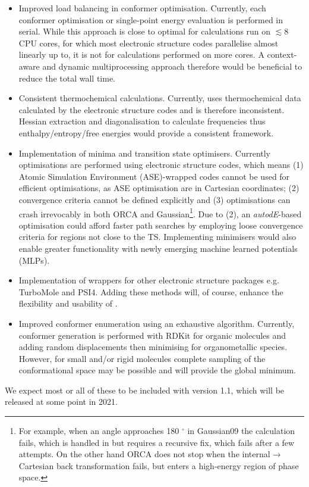 \documentclass[../../main.tex]{subfiles}
\begin{document}
\begin{itemize}
	\item Improved load balancing in conformer optimisation. Currently, each conformer optimisation or single-point energy evaluation is performed in serial. While this approach is close to optimal for calculations run on $\lesssim 8$ CPU cores, for which most electronic structure codes parallelise almost linearly up to, it is not for \ade calculations performed on more cores. A context-aware and dynamic multiprocessing approach therefore would be beneficial to reduce the total wall time.
	
	\item Consistent thermochemical calculations. Currently, \ade uses thermochemical data calculated by the electronic structure codes and is therefore inconsistent. Hessian extraction and diagonalisation to calculate frequencies thus enthalpy/entropy/free energies would provide a consistent framework.
	
	\item Implementation of minima and transition state optimisers. Currently optimisations are performed using electronic structure codes, which means (1) Atomic Simulation Environment (ASE\cite{ASE2017})-wrapped codes cannot be used for efficient optimisations, as ASE optimisation are in Cartesian coordinates; (2) convergence criteria cannot be defined explicitly and (3) optimisations can crash irrevocably in both ORCA and Gaussian\footnote{For example, when an angle approaches 180 ${}^{\circ}$ in Gaussian09 the calculation fails, which is handled in \ade but requires a recursive fix, which fails after a few attempts. On the other hand ORCA does not stop when the internal$\rightarrow$Cartesian back transformation fails, but enters a high-energy region of phase space.}. Due to (2), an \emph{autodE}-based optimisation could afford faster path searches by employing loose convergence criteria for regions not close to the TS. Implementing minimisers would also enable greater functionality with newly emerging machine learned potentials (MLPs).
	
	\item Implementation of wrappers for other electronic structure packages e.g. TurboMole and PSI4. Adding these methods will, of course, enhance the flexibility and usability of \ade.
	
	\item Improved conformer enumeration using an exhaustive algorithm. Currently, conformer generation is performed with RDKit for organic molecules and adding random displacements then minimising for organometallic species. However, for small and/or rigid molecules complete sampling of the conformational space may be possible and will provide the global minimum.
	
\end{itemize}

We expect most or all of these to be included with version 1.1, which will be released at some point in 2021.


\clearpage
\end{document}
